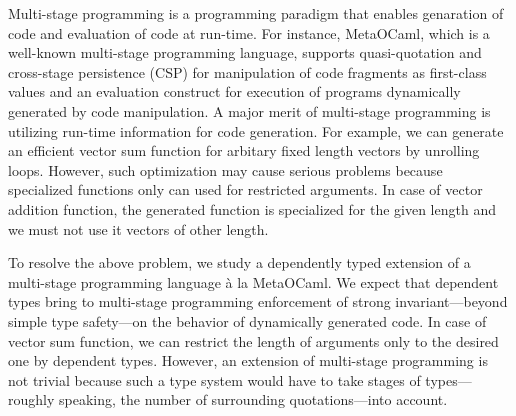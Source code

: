 \documentclass[master,english]{kuisthesis}
\begin{document}
\date{Feburary 15, 2020}			%

\maketitle

\begin{eabstract}


    Multi-stage programming is a programming paradigm that enables genaration
    of code and evaluation of code at run-time. For instance, MetaOCaml, which
    is a well-known multi-stage programming language, supports quasi-quotation
    and cross-stage persistence (CSP) for manipulation of code fragments as
    first-class values and an evaluation construct for execution of programs
    dynamically generated by code manipulation. A major merit of multi-stage
    programming is utilizing run-time information for code generation. For
    example, we can generate an efficient vector sum function for arbitary
    fixed length vectors by unrolling loops. However, such optimization may
    cause serious problems because specialized functions only can used for
    restricted arguments. In case of vector addition function, the generated
    function is specialized for the given length and we must not use it vectors
    of other length.


    To resolve the above problem, we study a dependently typed extension of a
    multi-stage programming language \`a la MetaOCaml. We expect that dependent
    types bring to multi-stage programming enforcement of strong
    invariant---beyond simple type safety---on the behavior of dynamically
    generated code. In case of vector sum function, we can
    restrict the length of arguments only to the desired one by dependent
    types. However, an extension of multi-stage programming is not trivial
    because such a type system would have to take stages of types---roughly
    speaking, the number of surrounding quotations---into account.



\end{eabstract}
\end{document}
